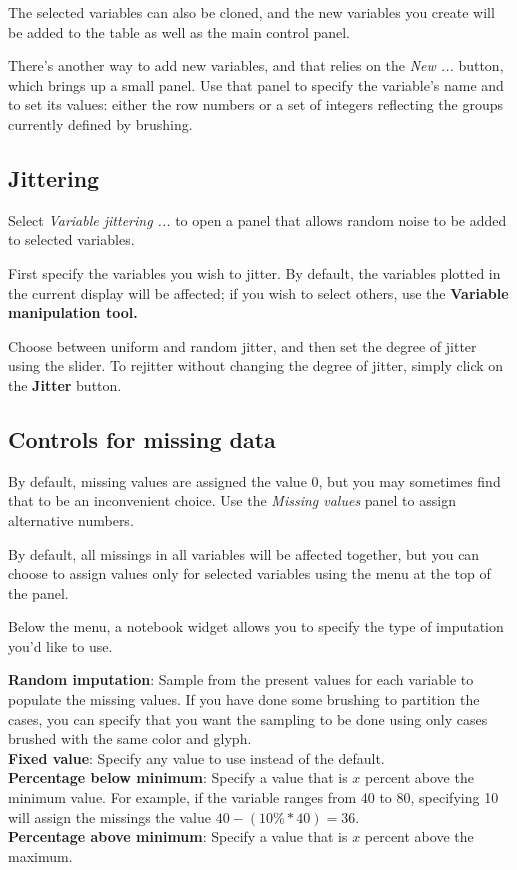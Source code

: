 \documentclass[11pt]{article}
\begin{document}
The selected variables can also be cloned, and the new variables
you create will be added to the table as well as the main control panel.

There's another way to add new variables, and that relies on the {\em New
...} button, which brings up a small panel.  Use that panel to specify
the variable's name and to set its values:  either the row numbers or
a set of integers reflecting the groups currently defined by brushing.

\subsection{Jittering}

Select {\em Variable jittering ...} to open a panel that allows
random noise to be added to selected variables.

First specify the variables you wish to jitter.  By default, the
variables plotted in the current display will be affected; if you
wish to select others, use the {\bf Variable manipulation tool.}

Choose between uniform and random jitter, and then set the degree of
jitter using the slider.  To rejitter without changing the degree of
jitter, simply click on the {\bf Jitter} button.

\subsection{Controls for missing data}

By default, missing values are assigned the value $0$, but you
may sometimes find that to be an inconvenient choice.  Use the
{\em Missing values} panel to assign alternative numbers.

By default, all missings in all variables will be affected
together, but you can choose to assign values only for selected
variables using the menu at the top of the panel.

Below the menu, a notebook widget allows you to specify the
type of imputation you'd like to use.

{\bf Random imputation}: Sample from the present values for each variable
  to populate the missing values.  If you have done some brushing to
  partition the cases, you can specify that you want the sampling to be
  done using only cases brushed with the same color and glyph.
\\{\bf Fixed value}: Specify any value to use instead of the default.
\\{\bf Percentage below minimum}: Specify a value that is $x$ percent
  above the minimum value.  For example, if the variable ranges from
 $40$ to $80$, specifying 10 will assign the missings the value $40 - (10\%
 * 40) = 36$.
\\{\bf Percentage above minimum}: Specify a value that is $x$ percent
above the maximum.
\end{document}
